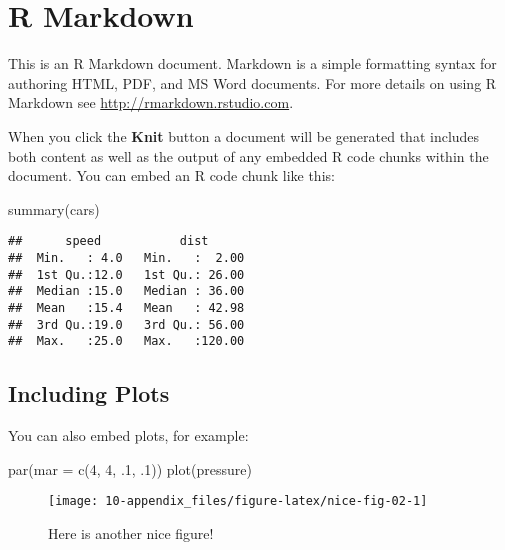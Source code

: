 \documentclass[
  lang=cn,
  11pt,
  scheme=chinese,
  chinesefont=nofont,
  citestyle=gb7714-2015,
  bibstyle=gb7714-2015]{elegantbook}
\newenvironment{Shaded}{\begin{snugshade}}{\end{snugshade}}
\newcommand{\AttributeTok}[1]{\textcolor[rgb]{0.77,0.63,0.00}{#1}}
\newcommand{\DecValTok}[1]{\textcolor[rgb]{0.00,0.00,0.81}{#1}}
\newcommand{\FunctionTok}[1]{\textcolor[rgb]{0.00,0.00,0.00}{#1}}
\newcommand{\NormalTok}[1]{#1}
\begin{document}
\hypertarget{appendix}{%
\appendix}


\hypertarget{r-markdown}{%
\chapter{R Markdown}\label{r-markdown}}

This is an R Markdown document. Markdown is a simple formatting syntax for authoring HTML, PDF, and MS Word documents. For more details on using R Markdown see \url{http://rmarkdown.rstudio.com}.

When you click the \textbf{Knit} button a document will be generated that includes both content as well as the output of any embedded R code chunks within the document. You can embed an R code chunk like this:

\begin{Shaded}
\begin{Highlighting}[]
\FunctionTok{summary}\NormalTok{(cars)}
\end{Highlighting}
\end{Shaded}

\begin{verbatim}
##      speed           dist       
##  Min.   : 4.0   Min.   :  2.00  
##  1st Qu.:12.0   1st Qu.: 26.00  
##  Median :15.0   Median : 36.00  
##  Mean   :15.4   Mean   : 42.98  
##  3rd Qu.:19.0   3rd Qu.: 56.00  
##  Max.   :25.0   Max.   :120.00
\end{verbatim}

\hypertarget{including-plots}{%
\section{Including Plots}\label{including-plots}}

You can also embed plots, for example:

\begin{Shaded}
\begin{Highlighting}[]
\FunctionTok{par}\NormalTok{(}\AttributeTok{mar =} \FunctionTok{c}\NormalTok{(}\DecValTok{4}\NormalTok{, }\DecValTok{4}\NormalTok{, .}\DecValTok{1}\NormalTok{, .}\DecValTok{1}\NormalTok{))}
\FunctionTok{plot}\NormalTok{(pressure)}
\end{Highlighting}
\end{Shaded}

\begin{figure}

{\centering \texttt{[image: 10-appendix\_files/figure-latex/nice-fig-02-1]} 

}

\caption{Here is another nice figure!}\label{fig:nice-fig-02}
\end{figure}
\end{document}
